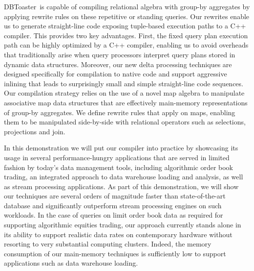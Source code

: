 \documentclass{vldb}
\newcommand{\comment}[1]{}
\newcommand{\compiler}{DBToaster}
\begin{document}
\compiler\ is capable of compiling relational algebra with group-by aggregates by
applying rewrite rules on these repetitive or standing queries. Our rewrites
enable us to generate straight-line code exposing tuple-based execution paths to
a C++ compiler. This provides two key advantages. First, the fixed query plan
execution path can be highly optimized by a C++ compiler, enabling us to avoid
overheads that traditionally arise when query processors interpret query plans
stored in dynamic data structures. Moreover, our new delta processing techniques
are designed specifically for compilation to native code and support aggressive
inlining that leads to surprisingly small and simple straight-line code
sequences. Our compilation strategy relies on the use of a novel map algebra to
manipulate associative map data structures that are effectively main-memory
representations of group-by aggregates. We define rewrite rules that apply on
maps, enabling them to be manipulated side-by-side with relational operators
such as selections, projections and join.

\comment{
Our query rewriting defines how to process a single tuple using a precomputed
view of the remainder query and data, representing and manipulating the query via
a map algebra. The map algebra corresponds to a main-memory version of group-by
aggregates. Maintaining such views in main-memory is extremely cheap with the
use of standard pointer-based data structures and delta processing techniques.
}

In this demonstration we will put our compiler into practice by showcasing its
usage in several performance-hungry applications that are served in limited
fashion by today's data management tools, including algorithmic order book
trading, an integrated approach to data warehouse loading and analysis, as well
as stream processing applications.
As part of this demonstration, we will show our techniques are several orders of
magnitude faster than state-of-the-art   database  and significantly outperform
stream processing engines on such workloads.  In the case of queries on limit
order  book  data  as  required for  supporting  algorithmic  equities trading,
our approach currently stands alone in its ability to support realistic  data
rates  on contemporary hardware without  resorting to very substantial computing
clusters. Indeed, the memory consumption of our main-memory techniques is
sufficiently low to support applications such as data warehouse loading.
\end{document}
